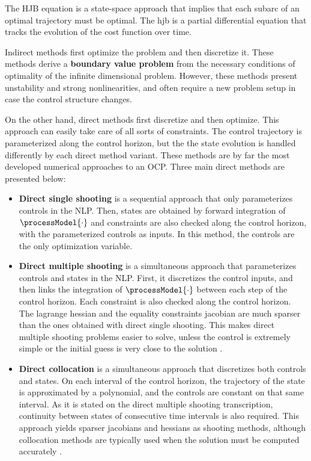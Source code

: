 The HJB equation is a state-space approach that implies that each subarc of an optimal trajectory must be optimal. The \acrlong{hjb} is a partial differential equation that tracks the evolution of the cost function over time.

Indirect methods first optimize the problem and then discretize it. These methods derive a \textbf{boundary value problem} from the necessary conditions of optimality of the infinite dimensional problem. However, these methods present unstability and strong nonlinearities, and often require a new problem setup in case the control structure changes.

On the other hand, direct methods first discretize and then optimize. This approach can easily take care of all sorts of constraints. The control trajectory is parameterized along the control horizon, but the the state evolution is handled differently by each direct method variant. These methods are by far the most developed numerical approaches to an OCP. Three main direct methods are presented below:

\begin{itemize}[label=\raisebox{0.5ex}{\scalebox{0.4}{$\blacksquare$}}]
\item \textbf{Direct single shooting} is a sequential approach that only parameterizes controls in the NLP. Then, states are obtained by forward integration of $\processModel{\cdot}$ and constraints are also checked along the control horizon, with the parameterized controls as inputs. In this method, the controls are the only optimization variable.
\item \textbf{Direct multiple shooting} is a simultaneous approach that parameterizes controls and states in the NLP. First, it discretizes the control inputs, and then links the integration of $\processModel{\cdot}$ between each step of the control horizon. Each constraint is also checked along the control horizon. The lagrange hessian and the equality constraints jacobian are much sparser than the ones obtained with direct single shooting. This makes direct multiple shooting problems easier to solve, unless the control is extremely simple or the initial guess is very close to the solution \cite{Silva2022msc}.
\item \textbf{Direct collocation} is a simultaneous approach that discretizes both controls and states. On each interval of the control horizon, the trajectory of the state is approximated by a polynomial, and the controls are constant on that same interval. As it is stated on the direct multiple shooting transcription, continuity between states of consecutive time intervals is also required. This approach yields sparser jacobians and hessians as shooting methods, although collocation methods are typically used when the solution must be computed accurately \cite{Silva2022msc}.
\end{itemize}

